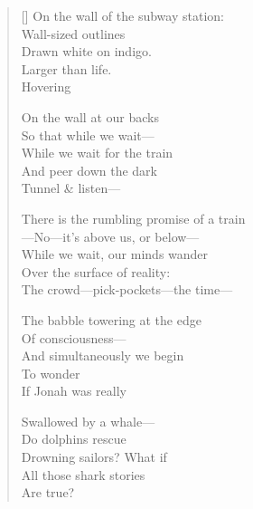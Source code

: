 \label{ch:dolphins_eels_sea_turtles}
\settowidth{\versewidth}{          On the wall of the subway station:}
\begin{verse}[\versewidth]
\hspace*{1\vgap} On the wall of the subway station:\\
Wall-sized outlines\\
Drawn white on indigo.\\
Larger than life.\\
Hovering

On the wall at our backs\\
So that while we wait---\\
While we wait for the train\\
And peer down the dark\\
Tunnel \& listen---

There is the rumbling promise of a train\\
---No---it's above us, or below---\\
While we wait, our minds wander\\
Over the surface of reality:\\
The crowd---pick-pockets---the time---

The babble towering at the edge\\
Of consciousness---\\
And simultaneously we begin\\
To wonder\\
If Jonah was really

Swallowed by a whale---\\
Do dolphins rescue\\
Drowning sailors?     What if\\
All those shark stories\\
Are true?
\end{verse}
